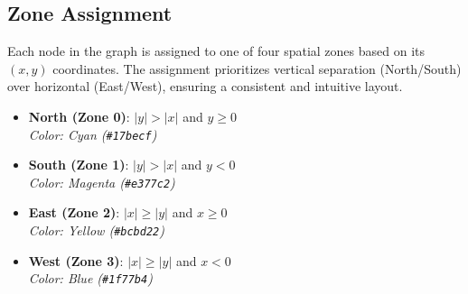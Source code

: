 \documentclass[12pt]{article}
\begin{document}
\subsection{Zone Assignment}

Each node in the graph is assigned to one of four spatial zones based on its $(x, y)$ coordinates. The assignment prioritizes vertical separation (North/South) over horizontal (East/West), ensuring a consistent and intuitive layout.

\begin{itemize}
    \item \textbf{North (Zone 0)}: $|y| > |x|$ and $y \geq 0$ \\
          \textit{Color: Cyan (\texttt{\#17becf})}
    \item \textbf{South (Zone 1)}: $|y| > |x|$ and $y < 0$ \\
          \textit{Color: Magenta (\texttt{\#e377c2})}
    \item \textbf{East (Zone 2)}: $|x| \geq |y|$ and $x \geq 0$ \\
          \textit{Color: Yellow (\texttt{\#bcbd22})}
    \item \textbf{West (Zone 3)}: $|x| \geq |y|$ and $x < 0$ \\
          \textit{Color: Blue (\texttt{\#1f77b4})}
\end{itemize}
\end{document}
